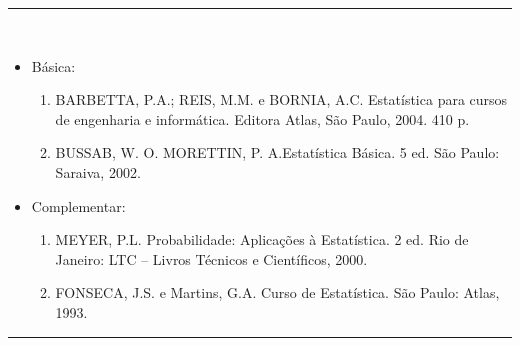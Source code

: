 \vspace{-5mm}
\noindent\rule{16.5cm}{0.4pt}
\\
\begin{itemize} 
  \item Básica:
	\begin{enumerate}
	\item BARBETTA, P.A.; REIS, M.M. e BORNIA, A.C. Estatística para cursos de engenharia e informática. Editora Atlas, São Paulo, 2004. 410 p.
	\item BUSSAB, W. O. MORETTIN, P. A.Estatística Básica.  5 ed.  São Paulo: Saraiva, 2002.
	\end{enumerate}
  \item Complementar:
	\begin{enumerate} 
	\item MEYER, P.L. Probabilidade: Aplicações à Estatística. 2 ed.  Rio de Janeiro: LTC – Livros Técnicos e Científicos, 2000.
	\item FONSECA, J.S. e Martins, G.A. Curso de Estatística. São Paulo: Atlas, 1993.
	\end{enumerate}
\end{itemize}
\noindent\rule{16.5cm}{0.4pt}\\
\\
